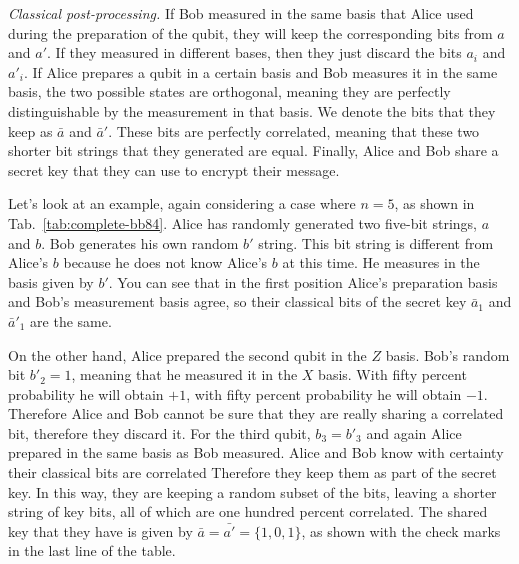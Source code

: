 \emph{Classical post-processing.}
If Bob measured in the same basis that Alice used during the preparation of the qubit, they will keep the corresponding bits from $a$ and $a'$.
If they measured in different bases, then they just discard the bits $a_i$ and $a'_i$.
If Alice prepares a qubit in a certain basis and Bob measures it in the same basis, the two possible states are orthogonal, meaning they are perfectly distinguishable by the measurement in that basis.
We denote the bits that they keep as $\bar{a}$ and $\bar{a}'$.
These bits are perfectly correlated, meaning that these two shorter bit strings that they generated are equal.
Finally, Alice and Bob share a secret key that they can use to encrypt their message.

Let's look at an example, again considering a case where $n=5$, as shown in Tab.~\ref{tab:complete-bb84}.
Alice has randomly generated two five-bit strings, $a$ and $b$.
Bob generates his own random $b'$ string.
This bit string is different from Alice's $b$ because he does not know Alice's $b$ at this time.
He measures in the basis given by $b'$.
You can see that in the first position Alice's preparation basis and Bob's measurement basis agree, so their classical bits of the secret key $\bar{a}_1$ and $\bar{a}'_1$ are the same.

On the other hand, Alice prepared the second qubit in the $Z$ basis.
Bob's random bit $b'_2 = 1$, meaning that he measured it in the $X$ basis.
With fifty percent probability he will obtain $+1$, with fifty percent probability he will obtain $-1$.
Therefore Alice and Bob cannot be sure that they are really sharing a correlated bit, therefore they discard it.
For the third qubit, $b_3 = b'_3$ and again Alice prepared in the same basis as Bob measured.
Alice and Bob know with certainty their classical bits are correlated Therefore they keep them as part of the secret key.
In this way, they are keeping a random subset of the bits, leaving a shorter string of key bits, all of which are one hundred percent correlated.
The shared key that they have is given by $\bar{a} = \bar{a'} = \{1, 0, 1\}$, as shown with the check marks in the last line of the table.


